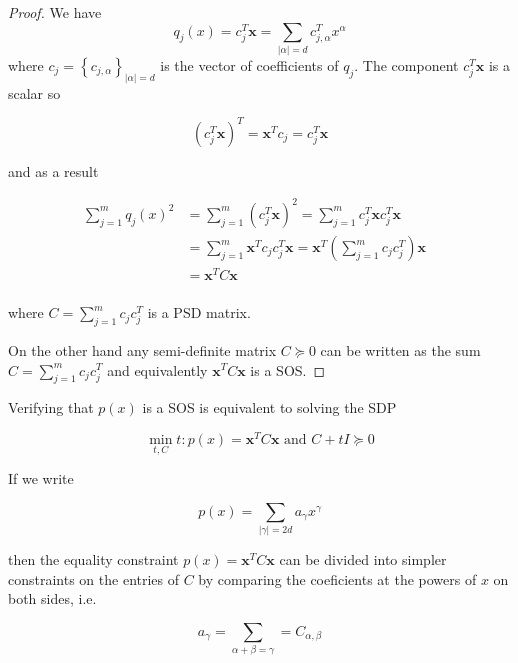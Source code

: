 \documentclass[onecolumn,11pt,a4paper]{article}
\theoremstyle{plain}  %
\theoremstyle{remark}  %
\begin{document}
	\begin{proof}
		We have 
		\begin{equation}
			q_j(x) = c_j^T \mathbf{x}  = \sum_{|\alpha|= d} c_{j, \alpha }^T x^{\alpha} 
		\end{equation}
		where $c_j = \left\{ c_{j, \alpha} \right\}_{|\alpha| = d}$ is the vector of
		coefficients of $q_j$. The component $c_j^T \mathbf{x}$ is a scalar so 

		\begin{equation}\left( c_j^T \mathbf{x}  \right)^T = \mathbf{x}^T c_j = c_j^T \mathbf{x}\end{equation}

		and as a result

		\begin{align*}	\sum_{j = 1}^m q_j (x)^2  & = \sum_{j = 1}^m \left( c_j^T \mathbf{x} 
			\right)^2   = \sum_{j = 1}^m c_j^T \mathbf{x} c_j^T \mathbf{x} \\ & = \sum_{j = 1}^m \mathbf{x}^T c_j
			c_j^T \mathbf{x}   =  \mathbf{x}^T \left( \sum_{j = 1}^m c_j c_j^T  \right)\mathbf{x} \\
			& = \mathbf{x}^T C \mathbf{x} & \\
		\end{align*}

		where $C = \sum_{j = 1}^m c_j c_j^T $ is a PSD matrix. 

		On the other hand any semi-definite matrix $C \succeq 0$ can be written as
		the sum $C = \sum_{j = 1}^m c_j c_j^T$ and equivalently $\mathbf{x}^T C
		\mathbf{x}$ is a SOS.
	\end{proof}

	Verifying that $p(x)$ is a SOS is equivalent to solving the SDP 

	\begin{equation}
		\min_{t, C} t : p(x) = \mathbf{x}^T C \mathbf{x} \text{ and } C + tI
		\succeq 0
		\label{}
	\end{equation}

	If we write
	
	\[
		p(x) = \sum_{|\gamma| = 2d} a_\gamma x^\gamma
	\]
	
	then the equality constraint $p(x) = \mathbf{x}^T C \mathbf{x}$ can be divided into
	simpler constraints on the entries of $C$ by comparing the coeficients at the
	powers of $x$ on both sides, i.e.

	\[
		a_\gamma = \sum_{\alpha + \beta = \gamma} = C_{\alpha, \beta}
	\]
\end{document}
